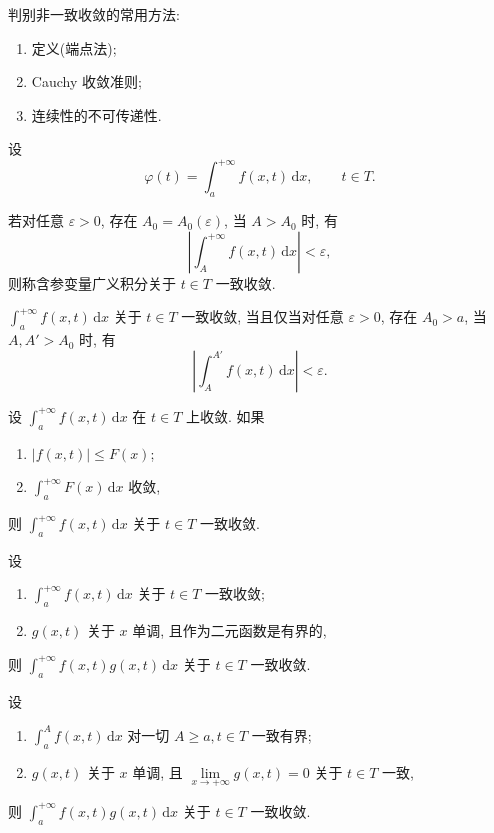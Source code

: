 判别非一致收敛的常用方法:
\begin{enumerate}
    \item 定义(端点法);
    \item Cauchy 收敛准则;
    \item 连续性的不可传递性.
\end{enumerate}

设
\[
    \varphi(t)=\int_a^{+\infty}f(x,t)\,\mathrm{d}x,\qquad t\in T.
\]

\begin{definition}
    若对任意 $\varepsilon>0$, 存在 $A_0=A_0(\varepsilon)$, 当 $A>A_0$ 时, 有
    \[
        \left|\int_A^{+\infty}f(x,t)\,\mathrm{d}x\right|<\varepsilon,
    \]
    则称含参变量广义积分关于 $t\in T$ 一致收敛.
\end{definition}

\begin{theorem}
    $\displaystyle\int_a^{+\infty}f(x,t)\,\mathrm{d}x$ 关于 $t\in T$ 一致收敛, 当且仅当对任意 $\varepsilon>0$, 存在 $A_0>a$, 当 $A,A'>A_0$ 时, 有
    \[
        \left|\int_A^{A'}f(x,t)\,\mathrm{d}x\right|<\varepsilon.
    \]
\end{theorem}

\begin{theorem}
    设 $\displaystyle\int_a^{+\infty}f(x,t)\,\mathrm{d}x$ 在 $t\in T$ 上收敛. 如果
    \begin{enumerate}
        \item $|f(x,t)|\leq F(x)$;
        \item $\displaystyle\int_a^{+\infty}F(x)\,\mathrm{d}x$ 收敛,
    \end{enumerate}
    则 $\displaystyle\int_a^{+\infty}f(x,t)\,\mathrm{d}x$ 关于 $t\in T$ 一致收敛.
\end{theorem}

\begin{theorem}
    设
    \begin{enumerate}
        \item $\displaystyle\int_a^{+\infty}f(x,t)\,\mathrm{d}x$ 关于 $t\in T$ 一致收敛;
        \item $g(x,t)$ 关于 $x$ 单调, 且作为二元函数是有界的,
    \end{enumerate}
    则 $\displaystyle\int_a^{+\infty}f(x,t)g(x,t)\,\mathrm{d}x$ 关于 $t\in T$ 一致收敛.
\end{theorem}

\begin{theorem}
    设
    \begin{enumerate}
        \item $\displaystyle\int_a^A f(x,t)\,\mathrm{d}x$ 对一切 $A\geq a,t\in T$ 一致有界;
        \item $g(x,t)$ 关于 $x$ 单调, 且 $\displaystyle\lim\limits_{x\to+\infty}g(x,t)=0$ 关于 $t\in T$ 一致,
    \end{enumerate}
    则 $\displaystyle\int_a^{+\infty}f(x,t)g(x,t)\,\mathrm{d}x$ 关于 $t\in T$ 一致收敛.
\end{theorem}

